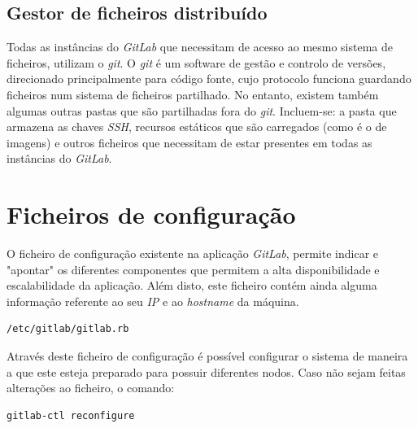 \documentclass[12pt,a4paper]{article}
\begin{document}
\subsection{Gestor de ficheiros distribuído}
Todas as instâncias do \emph{GitLab} que necessitam de acesso ao mesmo sistema de ficheiros, utilizam o \emph{git}. O \emph{git} é um software de gestão e controlo de versões, direcionado principalmente para código fonte, cujo protocolo funciona guardando ficheiros num sistema de ficheiros partilhado. No entanto, existem também algumas outras pastas que são partilhadas fora do \emph{git}. Incluem-se: a pasta que armazena as chaves \emph{SSH}, recursos estáticos que são carregados (como é o de imagens) e outros ficheiros que necessitam de estar presentes em todas as instâncias do \emph{GitLab}.







\newpage
\section{Ficheiros de configuração}

O ficheiro de configuração existente na aplicação \emph{GitLab}, permite indicar e "apontar" os diferentes componentes que permitem a alta disponibilidade e escalabilidade da aplicação. Além disto, este ficheiro contém ainda alguma informação referente ao seu \emph{IP} e ao \emph{hostname} da máquina.

\begin{verbatim}
/etc/gitlab/gitlab.rb
\end{verbatim}

Através deste ficheiro de configuração é possível configurar o sistema de maneira a que este esteja preparado para possuir diferentes nodos. Caso não sejam feitas alterações ao ficheiro, o comando:
\begin{verbatim}
gitlab-ctl reconfigure
\end{verbatim}
\end{document}
